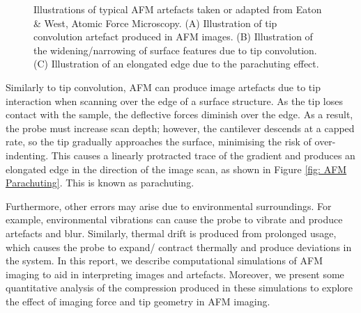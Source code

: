 \begin{figure}[ht]
    \caption{\label{fig: AFM Artefacts}Illustrations of typical AFM artefacts taken or adapted from Eaton \& West, Atomic Force Microscopy\cite{eaton2010atomic}. (A) Illustration of tip convolution artefact produced in AFM images. (B) Illustration of the widening/narrowing of surface features due to tip convolution. (C) Illustration of an elongated edge due to the parachuting effect. }
    
\end{figure}

Similarly to tip convolution, AFM can produce image artefacts due to tip interaction when scanning over the edge of a surface structure. As the tip loses contact with the sample, the deflective forces diminish over the edge. As a result, the probe must increase scan depth; however, the cantilever descends at a capped rate, so the tip gradually approaches the surface, minimising the risk of over-indenting. This causes a linearly protracted trace of the gradient and produces an elongated edge in the direction of the image scan, as shown in Figure \ref{fig: AFM Parachuting}. This is known as parachuting.

Furthermore, other errors may arise due to environmental surroundings. For example, environmental vibrations can cause the probe to vibrate and produce artefacts and blur. Similarly, thermal drift is produced from prolonged usage, which causes the probe to expand/ contract thermally and produce deviations in the system. In this report, we describe computational simulations of AFM imaging to aid in interpreting images and artefacts. Moreover, we present some quantitative analysis of the compression produced in these simulations to explore the effect of imaging force and tip geometry in AFM imaging.


